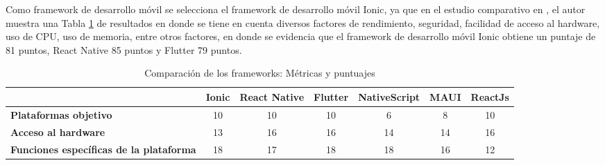 Como framework de desarrollo móvil se selecciona el framework de desarrollo móvil Ionic, ya que en el estudio comparativo en \cite{ahmad_analysis_2023}, el autor muestra una Tabla \ref{tab:table_movil_frameworks_comparacion} de resultados en donde se tiene en cuenta diversos factores de rendimiento, seguridad, facilidad de acceso al hardware, uso de CPU, uso de memoria, entre otros factores, en donde se evidencia que el framework de desarrollo móvil Ionic obtiene un puntaje de 81 puntos, React Native 85 puntos y Flutter 79 puntos.

\begin{footnotesize}
\begin{spacing}{1}

        \begin{center}
            \renewcommand*{\arraystretch}{1.4}
            \begin{longtable}[c]{ |>{\bfseries}p{}  |p{} |p{}  |p{}  |p{}  |p{}  |p{}|   }
                \caption[Comparación de los frameworks: Métricas y puntuajes]{ Comparación de los frameworks: Métricas y puntuajes \cite{ahmad_analysis_2023}}\label{tab:table_movil_frameworks_comparacion} \\
                \hline
                \multicolumn{1}{|c|}{ \textbf{Métrica}}  & \multicolumn{1}{c|}{\textbf{Ionic}} & \multicolumn{1}{c|}{ \textbf{React Native}} & \multicolumn{1}{c|}{ \textbf{Flutter}} & \multicolumn{1}{c|}{ \textbf{NativeScript}} & \multicolumn{1}{c|}{ \textbf{MAUI}} & \multicolumn{1}{c|}{ \textbf{ReactJs}}\\
                \hline
                Plataformas objetivo                   & \multicolumn{1}{c|}{10}             & \multicolumn{1}{c|}{10}                     & \multicolumn{1}{c|}{10} & \multicolumn{1}{c|}{6}  & \multicolumn{1}{c|}{8} & \multicolumn{1}{c|}{10} \\
                \hline
                Acceso al hardware                     & \multicolumn{1}{c|}{13}             & \multicolumn{1}{c|}{16}                     & \multicolumn{1}{c|}{16} & \multicolumn{1}{c|}{14} & \multicolumn{1}{c|}{14} & \multicolumn{1}{c|}{16} \\
                \hline
                Funciones específicas de la plataforma & \multicolumn{1}{c|}{18}             & \multicolumn{1}{c|}{17} & \multicolumn{1}{c|}{18} & \multicolumn{1}{c|}{18} & \multicolumn{1}{c|}{16} & \multicolumn{1}{c|}{12} \\

\end{longtable}
\end{center}
\end{spacing}
\end{footnotesize}
